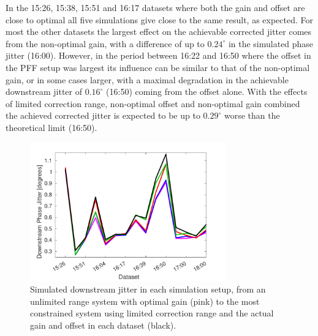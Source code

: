 %

In the 15:26, 15:38, 15:51 and 16:17 datasets where both the gain and offset are close to optimal all five simulations give close to the same result, as expected. For most the other datasets the largest effect on the achievable corrected jitter comes from the non-optimal gain, with a difference of up to \(0.24^\circ\) in the simulated phase jitter (16:00). However, in the period between 16:22 and 16:50 where the offset in the PFF setup was largest its influence can be similar to that of the non-optimal gain, or in some cases larger, with a maximal degradation in the achievable downstream jitter of \(0.16^\circ\) (16:50) coming from the offset alone. With the effects of limited correction range, non-optimal offset and non-optimal gain combined the achieved corrected jitter is expected to be up to \(0.29^\circ\) worse than the theoretical limit (16:50).%


\begin{figure}
  \centering
  \includegraphics[width=0.75\textwidth]{Figures/feedforward/longFF_datSetJitSim}
  \caption{Simulated downstream jitter in each simulation setup, from an unlimited range system with optimal gain (pink) to the most constrained system using limited correction range and the actual gain and offset in each dataset (black).}
  \label{f:longFF_datSetJitSim}
\end{figure}

